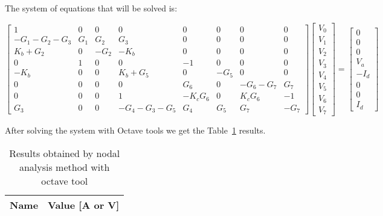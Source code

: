 The system of equations that will be solved is:

\begin{equation}
\begin{bmatrix} 
1 & 0 & 0 & 0 & 0 & 0 & 0 & 0 \\
-G_1 - G_2 - G_3 & G_1 & G_2 & G_3 & 0 & 0 & 0 & 0 \\
K_b + G_2 & 0 & -G_2 & -K_b & 0 & 0 & 0 & 0 \\
0 & 1 & 0 & 0 & -1 & 0 & 0 & 0 \\
-K_b & 0 & 0 & K_b + G_5 & 0 & -G_5 & 0 & 0 \\
0 & 0 & 0 & 0 & G_6 & 0 & -G_6 - G_7 & G_7 \\
0 & 0 & 0 & 1 & -K_c G_6 & 0 & K_c G_6 & -1 \\
G_3 & 0 & 0 & -G_4 - G_3 - G_5 & G_4 & G_5 & G_7 & -G_7
\end{bmatrix} 
\begin{bmatrix} 
V_0 \\ 
V_1 \\ 
V_2 \\ 
V_3 \\ 
V_4 \\ 
V_5 \\ 
V_6 \\ 
V_7
\end{bmatrix} =
\begin{bmatrix} 
0\\ 
0 \\ 
0 \\ 
V_a \\
-I_d \\ 
0 \\ 
0 \\ 
I_d
\end{bmatrix}
\end{equation}


After solving the system with Octave tools we get the Table~\ref{tab:nodal} results.

\begin{table}[h]
  \centering
  \begin{tabular}{|l|r|}
    \hline    
    {\bf Name} & {\bf Value [A or V]} \\ \hline
    
  \end{tabular}
  \caption{Results obtained by nodal analysis method with octave tool}
  \label{tab:nodal}
\end{table}



